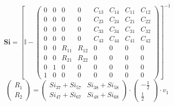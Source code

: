 \documentclass[10pt]{article} \usepackage{amsmath} \usepackage{bbold}
\begin{document}
\[ \mathbf{Si} = \left[ \mathbb{I}  - \left(\begin{array}{cccccccc} 0
& 0 & 0 & 0 & C_{13} & C_{14} & C_{11} & C_{12} \\ 0 & 0 & 0 & 0 &
C_{23} & C_{24} & C_{21} & C_{22} \\ 0 & 0 & 0 & 0 & C_{33} & C_{34} &
C_{31} & C_{32} \\ 0 & 0 & 0 & 0 & C_{43} & C_{44} & C_{41} & C_{42}
\\ 0 & 0 & R_{11} & R_{12} & 0 & 0 & 0 & 0 \\ 0 & 0 & R_{21} & R_{22}
& 0 & 0 & 0 & 0 \\ 0 & 1 & 0 & 0 & 0 & 0 & 0 & 0 \\ 1 & 0 & 0 & 0 & 0
& 0 & 0 & 0 \end{array}\right) \right]^{-1} \]
\[ \left(\begin{array}{c} R_{1} \\ R_{2}
\end{array}\right)=\left(\begin{array}{cc} Si_{37} + Si_{57} & Si_{38}
+ Si_{58} \\ Si_{47} + Si_{67} & Si_{48} + Si_{68}
\end{array}\right)\cdot \left(\begin{array}{c} -\frac{1}{2} \\
\frac{1}{2} \end{array}\right)\cdot v_{1} \]
\end{document}
